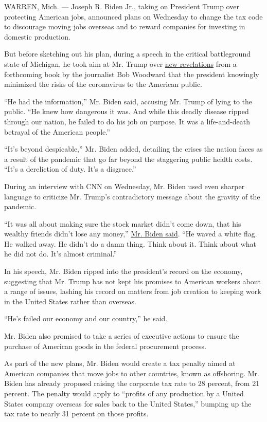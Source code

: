 WARREN, Mich. --- Joseph R. Biden Jr., taking on President Trump over
protecting American jobs, announced plans on Wednesday to change the tax
code to discourage moving jobs overseas and to reward companies for
investing in domestic production.

But before sketching out his plan, during a speech in the critical
battleground state of Michigan, he took aim at Mr. Trump over
\href{https://www.nytimes3xbfgragh.onion/live/2020/09/09/us/trump-vs-biden/trump-admitted-to-bob-woodward-that-he-intentionally-played-down-the-threat-of-the-coronavirus}{new
revelations} from a forthcoming book by the journalist Bob Woodward that
the president knowingly minimized the risks of the coronavirus to the
American public.

``He had the information,'' Mr. Biden said, accusing Mr. Trump of lying
to the public. ``He knew how dangerous it was. And while this deadly
disease ripped through our nation, he failed to do his job on purpose.
It was a life-and-death betrayal of the American people.''

``It's beyond despicable,'' Mr. Biden added, detailing the crises the
nation faces as a result of the pandemic that go far beyond the
staggering public health costs. ``It's a dereliction of duty. It's a
disgrace.''

During an interview with CNN on Wednesday, Mr. Biden used even sharper
language to criticize Mr. Trump's contradictory message about the
gravity of the pandemic.

``It was all about making sure the stock market didn't come down, that
his wealthy friends didn't lose any money,''
\href{https://twitter.com/mkraju/status/1303811690371444750}{Mr. Biden
said}. ``He waved a white flag. He walked away. He didn't do a damn
thing. Think about it. Think about what he did not do. It's almost
criminal.''

In his speech, Mr. Biden ripped into the president's record on the
economy, suggesting that Mr. Trump has not kept his promises to American
workers about a range of issues, lashing his record on matters from job
creation to keeping work in the United States rather than overseas.

``He's failed our economy and our country,'' he said.

Mr. Biden also promised to take a series of executive actions to ensure
the purchase of American goods in the federal procurement process.

As part of the new plans, Mr. Biden would create a tax penalty aimed at
American companies that move jobs to other countries, known as
offshoring. Mr. Biden has already proposed raising the corporate tax
rate to 28 percent, from 21 percent. The penalty would apply to
``profits of any production by a United States company overseas for
sales back to the United States,'' bumping up the tax rate to nearly 31
percent on those profits.

